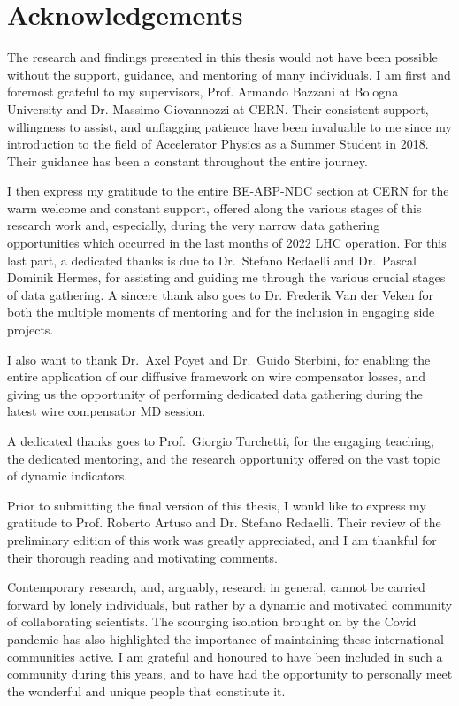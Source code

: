 \chapter*{Acknowledgements}
\sectionmark{}


The research and findings presented in this thesis would not have been possible without the support, guidance, and mentoring of many individuals. I am first and foremost grateful to my supervisors, Prof. Armando Bazzani at Bologna University and Dr. Massimo Giovannozzi at CERN. Their consistent support, willingness to assist, and unflagging patience have been invaluable to me since my introduction to the field of Accelerator Physics as a Summer Student in 2018. Their guidance has been a constant throughout the entire journey.

I then express my gratitude to the entire BE-ABP-NDC section at CERN for the warm welcome and constant support, offered along the various stages of this research work and, especially, during the very narrow data gathering opportunities which occurred in the last months of 2022 LHC operation. For this last part, a dedicated thanks is due to Dr.\ Stefano Redaelli and Dr.\ Pascal Dominik Hermes, for assisting and guiding me through the various crucial stages of data gathering. A sincere thank also goes to Dr. Frederik Van der Veken for both the multiple moments of mentoring and for the inclusion in engaging side projects. 

I also want to thank Dr.\ Axel Poyet and Dr.\ Guido Sterbini, for enabling the entire application of our diffusive framework on wire compensator losses, and giving us the opportunity of performing dedicated data gathering during the latest wire compensator MD session.

A dedicated thanks goes to Prof.\ Giorgio Turchetti, for the engaging teaching, the dedicated mentoring, and the research opportunity offered on the vast topic of dynamic indicators.

Prior to submitting the final version of this thesis, I would like to express my gratitude to Prof. Roberto Artuso and Dr. Stefano Redaelli. Their review of the preliminary edition of this work was greatly appreciated, and I am thankful for their thorough reading and motivating comments.

Contemporary research, and, arguably, research in general, cannot be carried forward by lonely individuals, but rather by a dynamic and motivated community of collaborating scientists. The scourging isolation brought on by the Covid pandemic has also highlighted the importance of maintaining these international communities active. I am grateful and honoured to have been included in such a community during this years, and to have had the opportunity to personally meet the wonderful and unique people that constitute it.

